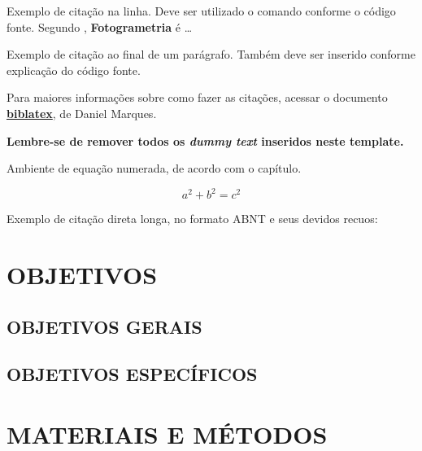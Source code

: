 \documentclass[
    12pt,				%
    a4paper,            %
    oneside,			%
    openright,			%
    ruledheader,
    anapcustomindent,
    sumario = tradicional,
    abntfigtabnum,
    tocpage=plain,
    english,			%
	brazil,				%
    ]{abntex-ifsuldeminas/abntex2-orientadora} %
\begin{document}
    Exemplo de citação na linha. Deve ser utilizado o comando conforme o código fonte. Segundo \textcite{Andrade2003}, \textbf{Fotogrametria} é \dots
    
    Exemplo de citação ao final de um parágrafo. Também deve ser inserido conforme explicação do código fonte. \cite{Monico2007}
    
    Para maiores informações sobre como fazer as citações, acessar o documento \href{http://mirrors.ctan.org/macros/latex/contrib/biblatex-contrib/biblatex-abnt/doc/biblatex-abnt.pdf}{\color{blue} \textbf{biblatex}}, de Daniel Marques.
    
    \textbf{Lembre-se de remover todos os \textit{dummy text} inseridos neste template.}
    
    Ambiente de equação numerada, de acordo com o capítulo.
    
    \begin{equation}
        a^2 + b^2 = c^2
    \end{equation}
    
    Exemplo de citação direta longa, no formato ABNT e seus devidos recuos:
    
    \begin{citacao}
        \lipsum[1] \cite{CoelhoFilho2007}
    \end{citacao}
    
    \lipsum[1-4]
    

\chapter{OBJETIVOS}
\section{OBJETIVOS GERAIS}
\lipsum[1]

\section{OBJETIVOS ESPECÍFICOS}
\lipsum[2]


\chapter{MATERIAIS E MÉTODOS}
\end{document}
